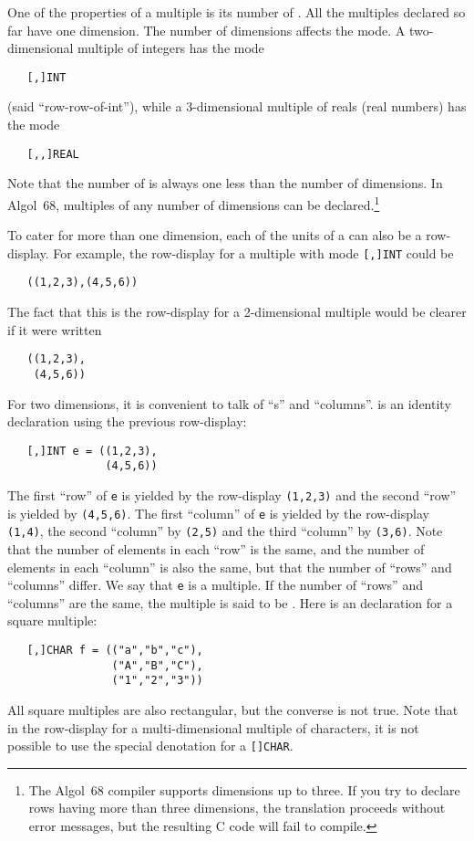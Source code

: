 One of the properties of a multiple is its number of
. All the multiples declared so far have one
dimension. The number of dimensions affects the mode.  A
two-dimensional multiple of integers has the mode
\begin{verbatim}
   [,]INT
\end{verbatim}
\noindent
(said ``row-row-of-int''), while a 3-dimensional multiple of reals
(real numbers) has the mode
\begin{verbatim}
   [,,]REAL
\end{verbatim}
\noindent
Note that the number of  is always one
less than the number of dimensions. In Algol~68, multiples of any
number of dimensions can be declared.\footnote{The
\protect{} Algol~68 compiler supports
dimensions up to three. If you try to declare rows having more
than three dimensions, the translation proceeds without error
messages, but the resulting C code will fail to compile.}

To cater for more than one dimension, each of the units of a
 can also be a row-display. For example,
the row-display for a multiple with mode \verb|[,]INT| could be
\begin{verbatim}
   ((1,2,3),(4,5,6))
\end{verbatim}
\noindent
The fact that this is the row-display for a 2-dimensional multiple
would be clearer if it were written
\begin{verbatim}
   ((1,2,3),
    (4,5,6))
\end{verbatim}
\noindent
For two dimensions, it is convenient to talk of ``s'' and
``col\-umns''.  is an identity declaration using
the previous row-dis\-play:
\begin{verbatim}
   [,]INT e = ((1,2,3),
               (4,5,6))
\end{verbatim}
\noindent
The first ``row'' of \verb|e| is yielded by the row-display
\verb|(1,2,3)| and the second ``row'' is yielded by \verb|(4,5,6)|.
The first ``column'' of \verb|e| is yielded by the row-display
\verb|(1,4)|, the second ``column'' by \verb|(2,5)| and the third
``column'' by \verb|(3,6)|.  Note that the number of elements in each
``row'' is the same, and the number of elements in each ``column'' is
also the same, but that the number of ``rows'' and ``columns''
differ.  We say that \verb|e| is a
 multiple. If
the number of ``rows'' and ``columns'' are the same, the multiple is
said to be .  Here is an
 declaration for a square
multiple:
\begin{verbatim}
   [,]CHAR f = (("a","b","c"),
                ("A","B","C"),
                ("1","2","3"))
\end{verbatim}
\noindent
All square multiples are also rectangular, but the converse is not
true. Note that in the row-display for a multi-dimensional multiple
of characters, it is not possible to use the special denotation for a
\verb|[]CHAR|.


